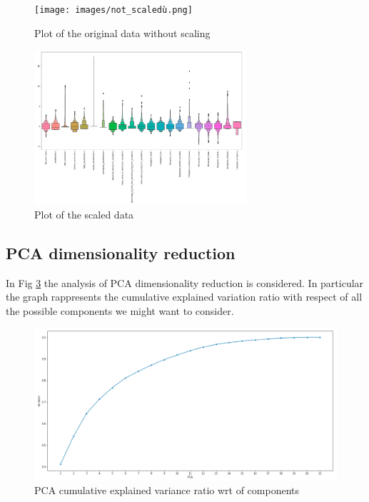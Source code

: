 \documentclass[a4paper,12pt]{article}
\begin{document}
\begin{figure}[H]
  \begin{center}
  \texttt{[image: images/not\_scaledù.png]}
  \end{center}
  \caption{Plot of the original data without scaling}
  \label{fig:notscaled}
\end{figure}
\begin{figure}[H]
  \begin{center}
  \includegraphics[width=0.7\textwidth]{images/scaled.png}
  \end{center}
  \caption{Plot of the scaled data}
  \label{fig:scaled}
\end{figure}

\newpage
\subsection{PCA dimensionality reduction}
\bigbreak
\noindent In Fig \ref{fig:pca} the analysis of PCA dimensionality reduction is considered. In particular the graph rappresents the cumulative explained variation ratio with respect of all the possible components we might want to consider.

\begin{figure}[H]
  \begin{center}
  \includegraphics[width=1.0\textwidth]{images/pca.png}
  \end{center}
  \caption{PCA cumulative explained variance ratio wrt of components}
  \label{fig:pca}
\end{figure}
\end{document}
